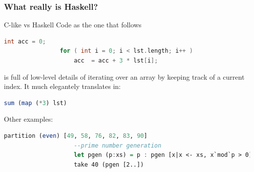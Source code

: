 		\begin{frame}[fragile]\frametitle{What really is Haskell?}
			\begin{exampleblock}{C-like vs Haskell}
			Code as the one that follows
			\begin{lstlisting}[language=C++]
				int acc = 0;
				for ( int i = 0; i < lst.length; i++ )
 					acc	 = acc + 3 * lst[i];
			\end{lstlisting}
			is full of low-level details of iterating over an array by
			keeping track of a current index. It much elegantely translates in:
			\begin{lstlisting}[language=Haskell]
					sum (map (*3) lst)
			\end{lstlisting}
			\end{exampleblock}
			Other examples:
			\begin{lstlisting}[language=Haskell,xleftmargin=-1.5em]
					partition (even) [49, 58, 76, 82, 83, 90]
					--prime number generation
					let pgen (p:xs) = p : pgen [x|x <- xs, x`mod`p > 0]
					take 40 (pgen [2..])
				\end{lstlisting}
	\end{frame}